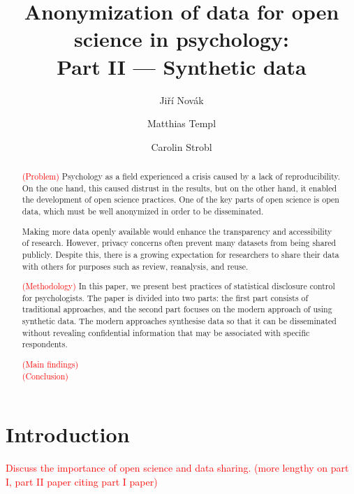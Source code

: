 \documentclass{article}
\title{Anonymization of data for open science in psychology: \\ 
       Part II — Synthetic data
}
\author{Jiří Novák \and 
        Matthias Templ \and 
        Carolin Strobl
        }
\begin{document}
\maketitle

\begin{abstract}
\textcolor{red}{(Problem)} Psychology as a field experienced a crisis caused by a lack of reproducibility. On the one hand, this caused distrust in the results, but on the other hand, it enabled the development of open science practices. One of the key parts of open science is open data, which must be well anonymized in order to be disseminated. 

Making more data openly available would enhance the transparency and accessibility of research. However, privacy concerns often prevent many datasets from being shared publicly. Despite this, there is a growing expectation for researchers to share their data with others for purposes such as review, reanalysis, and reuse.

\textcolor{red}{(Methodology)} In this paper, we present best practices of statistical disclosure control for psychologists. The paper is divided into two parts: the first part consists of traditional approaches, and the second part focuses on the modern approach of using synthetic data.
The modern approaches synthesise data so that it can be disseminated without revealing confidential information that may be associated with specific respondents. 

\textcolor{red}{(Main findings)} \\ 
\textcolor{red}{(Conclusion)} \\ 

\end{abstract}


\section{Introduction}

\textcolor{red}{Discuss the importance of open science and data sharing. (more lengthy on part I, part II paper citing part I paper)}
\end{document}
